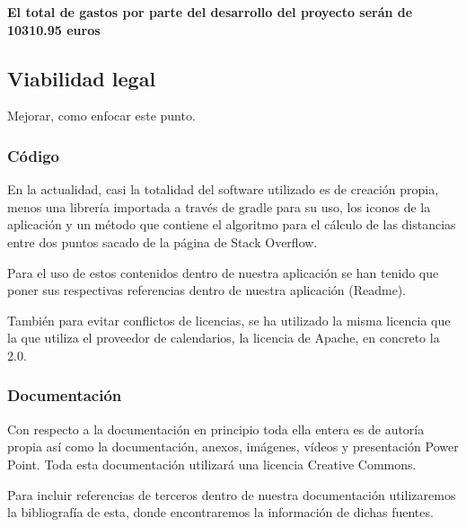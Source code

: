 \textbf{El total de gastos por parte del desarrollo del proyecto serán de 10310.95 euros}

\subsection{Viabilidad legal}
Mejorar, como enfocar este punto.

\subsubsection{Código}
En la actualidad, casi la totalidad del software utilizado es de creación propia, menos una librería importada a través de gradle para su uso, los iconos de la aplicación y un método que contiene el algoritmo para el cálculo de las distancias entre dos puntos sacado de la página de Stack Overflow.

Para el uso de estos contenidos dentro de nuestra aplicación se han tenido que poner sus respectivas referencias dentro de nuestra aplicación (Readme).

También para evitar conflictos de licencias, se ha utilizado la misma licencia que la que utiliza el proveedor de calendarios, la licencia de Apache, en concreto la 2.0.

\subsubsection{Documentación}
Con respecto a la documentación en principio toda ella entera es de autoría propia así como la documentación, anexos, imágenes, vídeos y presentación Power Point. Toda esta documentación utilizará una licencia Creative Commons.

Para incluir referencias de terceros dentro de nuestra documentación utilizaremos la bibliografía de esta, donde encontraremos la información de dichas fuentes.